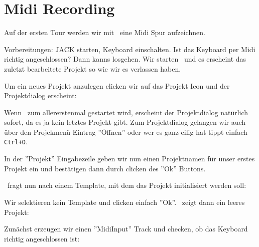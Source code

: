 \section{Midi Recording}
      Auf der ersten Tour werden wir mit \M\ eine Midi Spur
      aufzeichnen.

      Vorbereitungen: JACK starten, Keyboard einschalten. 
      Ist das Keyboard per Midi richtig angeschlossen? 
      Dann kanns losgehen. Wir starten \M\ und es erscheint das
      zuletzt bearbeitete Projekt so wie wir es verlassen haben.

      Um ein neues Projekt anzulegen clicken wir auf das Projekt
      Icon und der Projektdialog erscheint:


      Wenn \M\ zum allererstenmal gestartet wird, erscheint der
      Projektdialog natürlich sofort, da es ja kein letztes Projekt
      gibt. Zum Projektdialog gelangen wir auch über den Projekmenü
      Eintrag ''Öffnen'' oder wer es ganz eilig hat tippt einfach
      {\tt Ctrl+O}.

      In der ''Projekt'' Eingabezeile geben wir nun einen Projektnamen
      für unser erstes Projekt ein und bestätigen dann durch clicken
      des ''Ok'' Buttons.

      \M\ fragt nun nach einem Template, mit dem das Projekt
      initialisiert werden soll:


      Wir selektieren kein Template und clicken einfach ''Ok''.
      \M\ zeigt dann ein leeres Projekt:


      Zunächst erzeugen wir einen ''MidiInput'' Track und checken,
      ob das Keyboard richtig angeschlossen ist:
      
